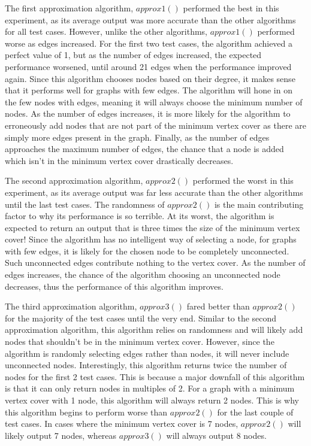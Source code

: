 \documentclass[titlepage]{article}
\begin{document}
The first approximation algorithm, $approx1()$ performed the best in this experiment, as its average output was more accurate than the other algorithms for all test cases. However, unlike the other algorithms, $approx1()$ performed worse as edges increased. For the first two test cases, the algorithm achieved a perfect value of 1, but as the number of edges increased, the expected performance worsened, until around 21 edges when the performance improved again. Since this algorithm chooses nodes based on their degree, it makes sense that it performs well for graphs with few edges. The algorithm will hone in on the few nodes with edges, meaning it will always choose the minimum number of nodes. As the number of edges increases, it is more likely for the algorithm to erroneously add nodes that are not part of the minimum vertex cover as there are simply more edges present in the graph. Finally, as the number of edges approaches the maximum number of edges, the chance that a node is added which isn't in the minimum vertex cover drastically decreases. 

The second approximation algorithm, $approx2()$ performed the worst in this experiment, as its average output was far less accurate than the other algorithms until the last test cases.
The randomness of $approx2()$ is the main contributing factor to why its performance is so terrible. At its worst, the algorithm is expected to return an output that is three times the size of the minimum vertex cover! Since the algorithm has no intelligent way of selecting a node, for graphs with few edges, it is likely for the chosen node to be completely unconnected. Such unconnected edges contribute nothing to the vertex cover. As the number of edges increases, the chance of the algorithm choosing an unconnected node decreases, thus the performance of this algorithm improves.

The third approximation algorithm, $approx3()$ fared better than $approx2()$ for the majority of the test cases until the very end. Similar to the second approximation algorithm, this algorithm relies on randomness and will likely add nodes that shouldn't be in the minimum vertex cover. However, since the algorithm is randomly selecting edges rather than nodes, it will never include unconnected nodes. Interestingly, this algorithm returns twice the number of nodes for the first 2 test cases. This is because a major downfall of this algorithm is that it can only return nodes in multiples of 2. For a graph with a minimum vertex cover with 1 node, this algorithm will always return 2 nodes. This is why this algorithm begins to perform worse than $approx2()$ for the last couple of test cases. In cases where the minimum vertex cover is 7 nodes, $approx2()$ will likely output 7 nodes, whereas $approx3()$ will always output 8 nodes.
\end{document}
